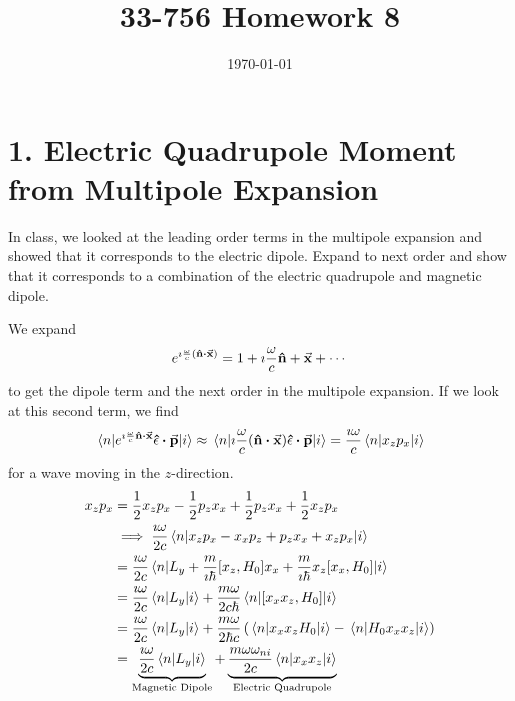 \documentclass[a4paper,twoside]{article}
\title{33-756 Homework 8}
\date{\today}
\begin{document}
\maketitle

\section*{1. Electric Quadrupole Moment from Multipole Expansion}
In class, we looked at the leading order terms in the multipole expansion and showed that it corresponds to the electric dipole. Expand to next order and show that it corresponds to a combination of the electric quadrupole and magnetic dipole.
\begin{problem}
    We expand
    \begin{equation}
        e^{\imath \frac{\omega}{c} (\vu{n} \vdot \va{x})} = 1 + \imath \frac{\omega}{c} \vu{n} + \va{x} +\cdots
    \end{equation}
    to get the dipole term and the next order in the multipole expansion. If we look at this second term, we find
    \begin{equation}
        \mel{n}{e^{\imath \frac{\omega}{c} \vu{n} \vdot \va{x}} \vu{\epsilon} \vdot \va{p}}{i} \approx \mel{n}{\imath \frac{\omega}{c} (\vu{n} \vdot \va{x}) \vu{\epsilon} \vdot \va{p}}{i} = \frac{\imath \omega}{c} \mel{n}{x_z p_x}{i}
    \end{equation}
    for a wave moving in the $ z $-direction.
    \begin{align}
        x_z p_x &= \frac{1}{2} x_z p_x - \frac{1}{2} p_z x_x + \frac{1}{2} p_z x_x + \frac{1}{2} x_z p_x \\
        &\implies \frac{\imath \omega}{2c} \mel{n}{x_z p_x - x_x p_z + p_z x_x + x_z p_x}{i} \\
        &= \frac{\imath \omega}{2c} \mel{n}{L_y + \frac{m}{\imath \hbar} \comm{x_z}{H_0} x_x + \frac{m}{\imath \hbar} x_z \comm{x_x}{H_0}}{i} \\
        &= \frac{\imath \omega}{2c} \mel{n}{L_y}{i} + \frac{m \omega}{2c \hbar} \mel{n}{\comm{x_x x_z}{H_0}}{i} \\
        &= \frac{\imath \omega}{2c} \mel{n}{L_y}{i} + \frac{m \omega}{2 \hbar c} \left( \mel{n}{x_x x_z H_0}{i} - \mel{n}{H_0 x_x x_z}{i} \right) \\
        &= \underbrace{\frac{\imath \omega}{2c} \mel{n}{L_y}{i}}_{\text{Magnetic Dipole}} + \underbrace{\frac{m \omega \omega_{ni}}{2c} \mel{n}{x_x x_z}{i}}_{\text{Electric Quadrupole}}
    \end{align}
\end{problem}
\end{document}
